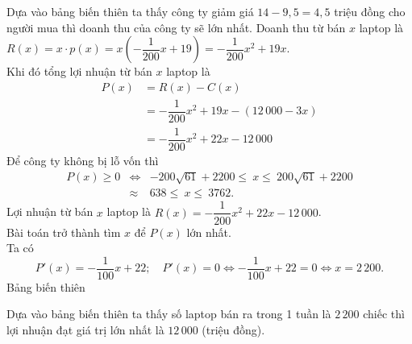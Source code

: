 \begin{ex}
{\begin{itemchoice}
\begin{center}
\begin{tikzpicture}[font=\footnotesize,thick,>=stealth]
\end{tikzpicture}
\end{center}
Dựa vào bảng biến thiên ta thấy công ty giảm giá $14-9{,}5=4{,}5$ triệu đồng cho người mua thì doanh thu của công ty sẽ lớn nhất.
\itemch	Doanh thu từ bán $x$ laptop là $R(x)=x \cdot p(x)=x\left(-\dfrac{1}{200} x+19\right)=-\dfrac{1}{200} x^2+19 x$.
\\
Khi đó tổng lợi nhuận từ bán $x$ laptop là
\begin{align*}
P ( x )&= R ( x )- C ( x ) \\
& =-\dfrac{1}{200} x^2+19 x-(12\,000-3 x) \\
& =-\dfrac{1}{200} x^2+22 x-12\,000
\end{align*}
Để công ty không bị lỗ vốn thì
\begin{eqnarray*}
P(x) \ge 0 &\Leftrightarrow& -200\sqrt{61}+2200\le \:x\le \:200\sqrt{61}+2200 \\
&\approx& 638 \le \:x\le \:3762.
\end{eqnarray*}
\itemch	Lợi nhuận từ bán $x$ laptop là $R(x)=-\dfrac{1}{200} x^2+22 x-12\,000$.\\
Bài toán trở thành tìm $x$ để $P ( x )$ lớn nhất.
\\
Ta có
\[
P'(x)=-\dfrac{1}{100} x+22; \quad P'(x)=0 \Leftrightarrow-\dfrac{1}{100} x+22=0 \Leftrightarrow x=2\,200.
\]
Bảng biến thiên
\begin{center}
\end{center}
Dựa vào bảng biến thiên ta thấy số laptop bán ra trong 1 tuần là $ 2\,200 $ chiếc thì lợi nhuận đạt giá trị lớn nhất là $12\,000$ (triệu đồng).
\end{itemchoice}
}
\end{ex}

